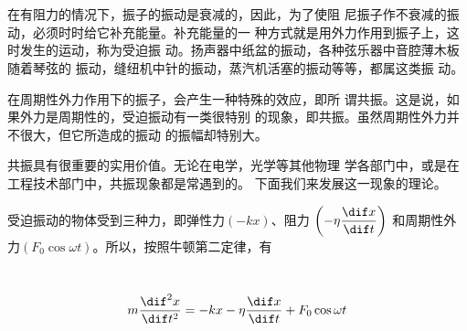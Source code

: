 \documentclass[../outline-of-mechanics.tex]{subfiles}
\begin{document}
\section[共振]{}\label{sec:07.05}

在有阻力的情况下，振子的振动是衰减的，因此，为了使阻
尼振子作不衰减的振动，必须时时给它补充能量。补充能量的一
种方式就是用外力作用到振子上，这时发生的运动，称为受迫振
动。扬声器中纸盆的振动，各种弦乐器中音腔薄木板随着琴弦的
振动，缝纽机中针的振动，蒸汽机活塞的振动等等，都属这类振
动。

在周期性外力作用下的振子，会产生一种特殊的效应，即所
谓共振。这是说，如果外力是周期性的，受迫振动有一类很特别
的现象，即共振。虽然周期性外力并不很大，但它所造成的振动
的振幅却特别大。

共振具有很重要的实用价值。无论在电学，光学等其他物理
学各部门中，或是在工程技术部门中，共振现象都是常遇到的。
下面我们来发展这一现象的理论。

受迫振动的物体受到三种力，即弹性力$ \left( - k x \right) $、阻力
$ \left( - \eta \dfrac { \dif x } { \dif t } \right) $
和周期性外力$ \left( F _ { 0 } \cos \omega t \right) $。所以，按照牛顿第二定律，有

~\vspace{-1.56em}
\begin{equation*}
  m \frac { \dif ^ { 2 } x } { \dif t ^ { 2 } } = - k x - \eta \frac { \dif x } { \dif t } + F _ { 0 } \cos \omega t
\end{equation*}
\end{document}
